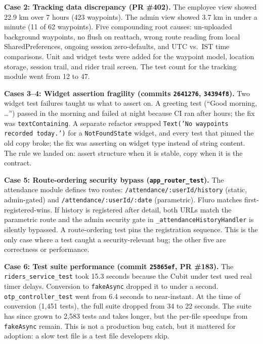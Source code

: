 \documentclass[10pt,journal,compsoc]{IEEEtran}
\begin{document}
\textbf{Case 2: Tracking data discrepancy (PR \#402).}
The employee view showed 22.9 km over 7 hours (423 waypoints). The admin
view showed 3.7 km in under a minute (11 of 62 waypoints). Five
compounding root causes: un-uploaded background waypoints, no flush on
reattach, wrong route reading from local SharedPreferences, ongoing
session zero-defaults, and UTC vs.\ IST time comparisons. Unit and widget
tests were added for the waypoint model, location storage, session trail,
and rider trail screen. The test count for the tracking module went from
12 to 47.

\textbf{Cases 3--4: Widget assertion fragility (commits \texttt{2641276},
\texttt{34394f8}).}
Two widget test failures taught us what to assert on. A greeting test
(``Good morning, \ldots'') passed in the morning and failed at night
because CI ran after hours; the fix was \texttt{textContaining}. A
separate refactor swapped \texttt{Text('No waypoints recorded today.')}
for a \texttt{NotFoundState} widget, and every test that pinned the old
copy broke; the fix was asserting on widget type instead of string
content. The rule we landed on: assert structure when it is stable, copy
when it is the contract.

\textbf{Case 5: Route-ordering security bypass (\texttt{app\_router\_test}).}
The attendance module defines two routes:
\texttt{/attendance/:userId/history} (static, admin-gated) and
\texttt{/attendance/:userId/:date} (parametric). Fluro matches
first-registered-wins. If history is registered after detail, both URLs
match the parametric route and the admin security gate in
\texttt{\_attendanceHistoryHandler} is silently bypassed. A route-ordering
test pins the registration sequence. This is the only case where a test
caught a security-relevant bug; the other five are correctness or
performance.

\textbf{Case 6: Test suite performance (commit \texttt{25865ef}, PR \#183).}
The \texttt{riders\_service\_test} took 15.3 seconds because the Cubit
under test used real timer delays. Conversion to \texttt{fakeAsync}
dropped it to under a second. \texttt{otp\_controller\_test} went from 6.4
seconds to near-instant. At the time of conversion (1,451 tests), the
full suite dropped from 34 to 22 seconds. The suite has since grown to
2,583 tests and takes longer, but the per-file speedups from
\texttt{fakeAsync} remain. This is not a production bug catch, but it
mattered for adoption: a slow test file is a test file developers skip.

\end{document}
